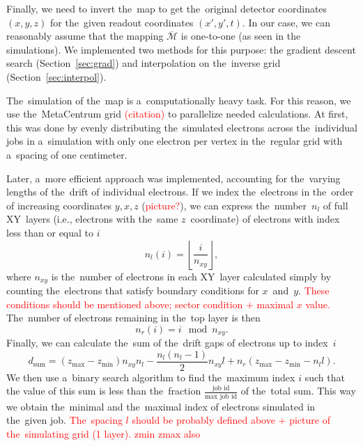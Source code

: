 		Finally, we need to invert the~map to get the~original detector coordinates $(x,y,z)$ for the~given readout coordinates $(x',y',t)$. In our case, we can reasonably assume that the mapping $\overbar{\mathcal{M}}$ is one-to-one (as seen in the simulations). We implemented two methods for this purpose: the gradient descent search (Section~\ref{sec:grad}) and interpolation on the~inverse grid (Section~\ref{sec:interpol}).
		
		The~simulation of the~map is a~computationally heavy task. For this reason, we use the~MetaCentrum grid \textcolor{red}{(citation)} to parallelize needed calculations. At first, this was done by evenly distributing the~simulated electrons across the~individual jobs in a~simulation with only one electron per vertex in the~regular grid with a~spacing of one centimeter. 
		
		Later, a~more efficient approach was implemented, accounting for the~varying lengths of the~drift of individual electrons. If we index the~electrons in the~order of increasing coordinates $y,x,z$ (\textcolor{red}{picture?}), we can express the~number~$n_l$ of full XY~layers (i.e., electrons with the~same $z$~coordinate) of electrons with index less than or equal to $i$
			\begin{equation}
				n_l(i) = \left\lfloor\frac{i}{n_{xy}}\right\rfloor,
			\end{equation}
		where $n_{xy}$ is the~number of electrons in each XY~layer calculated simply by counting the~electrons that satisfy boundary conditions for $x$~and~$y$. \textcolor{red}{These conditions should be mentioned above; sector condition + maximal $x$ value.} The~number of electrons remaining in the~top layer is then
			\begin{equation}
				n_r(i) = i\!\!\!\!\mod n_{xy}.
			\end{equation}
		Finally, we can calculate the~sum of the~drift gaps of electrons up to index~$i$
			\begin{equation}
				d_\text{sum} = (z_\text{max}-z_\text{min})n_{xy}n_l-\frac{n_l(n_l-1)}{2}n_{xy}l+n_r(z_\text{max}-z_\text{min}-n_l l).
			\end{equation}
		We then use a~binary search algorithm to find the~maximum index $i$ such that the value of this sum is less than the~fraction $\frac{\text{job id}}{\text{max job id}}$ of the~total sum. This way we obtain the~minimal and the~maximal index of electrons simulated in the~given job.
		\textcolor{red}{The~spacing $l$ should be probably defined above + picture of the~simulating grid (1 layer). zmin zmax also}
		
